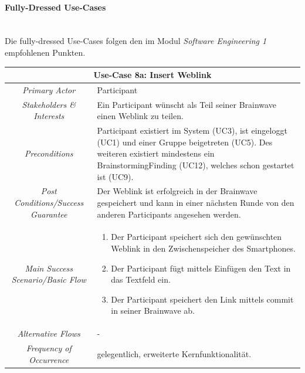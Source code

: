 \paragraph{Fully-Dressed Use-Cases}
\label{par:fully-dressed-uc}~\\
Die fully-dressed Use-Cases folgen den im Modul \textit{Software Engineering 1} empfohlenen Punkten.
\renewcommand{\arraystretch}{1.35}
\begin{center}
	\begin{longtable}{| c | p{7cm} |}
		\hline
		\multicolumn{2}{|c|}{\textbf{Use-Case 8a: Insert Weblink}}\\
		\hline\hline
		\textit{Primary Actor} & Participant\\
		\hline
		\textit{Stakeholders \& Interests} & Ein Participant wünscht als Teil seiner Brainwave einen Weblink zu teilen. \\
		\hline
		\textit{Preconditions} & Participant existiert im System (UC3), ist eingeloggt (UC1) und einer Gruppe beigetreten (UC5). Des weiteren existiert mindestens ein BrainstormingFinding (UC12), welches schon gestartet ist (UC9).\\
		\hline
		\textit{Post Conditions/Success Guarantee} & Der Weblink ist erfolgreich in der Brainwave gespeichert und kann in einer nächsten Runde von den anderen Participants angesehen werden.\\
		\hline
		\textit{Main Success Scenario/Basic Flow} & 
		\begin{enumerate}[noitemsep]
			\item Der Participant speichert sich den gewünschten Weblink in den Zwischenspeicher des Smartphones.
			\item Der Participant fügt mittels Einfügen den Text in das Textfeld ein.
			\item Der Participant speichert den Link mittels commit in seiner Brainwave ab.
		\end{enumerate}\\
		\hline
		\textit{Alternative Flows} &
		-\\
		\hline
		\textit{Frequency of Occurrence} & gelegentlich, erweiterte Kernfunktionalität.\\
		\hline
	\end{longtable}
\end{center}

